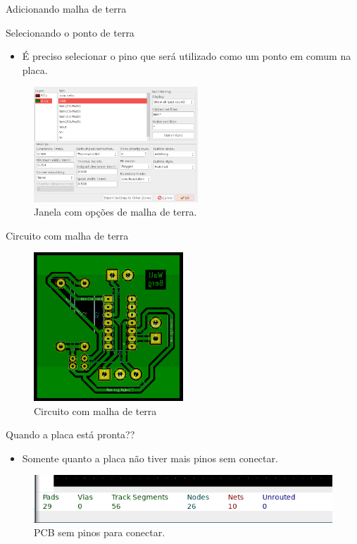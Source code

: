 \documentclass{beamer}
\begin{document}
\begin{frame}{Adicionando malha de terra}
	\begin{block}{Selecionando o ponto de terra}
		\begin{itemize}
			\item É preciso selecionar o pino que será utilizado como um ponto em comum na placa.
		\end{itemize}
	\end{block}
	\begin{figure}
		\centering
		\includegraphics[width=0.55\textwidth]{Imagens/36_malha_terra_janela.png}
		\caption{Janela com opções de malha de terra.}
	\end{figure}
\end{frame}

\begin{frame}{Circuito com malha de terra}
	\begin{figure}
		\centering
		\includegraphics[width=0.5\textwidth]{Imagens/37_circ_com_malha.png}
		\caption{Circuito com malha de terra}
	\end{figure}
\end{frame}

\begin{frame}{Quando a placa está pronta??}
	\begin{itemize}
		\item Somente quanto a placa não tiver mais pinos sem conectar.
	\end{itemize}
	\begin{figure}
		\centering
		\includegraphics[width=1\textwidth]{Imagens/38_0_unrouted.png}
		\caption{PCB sem pinos para conectar.}
	\end{figure}
\end{frame}
\end{document}
